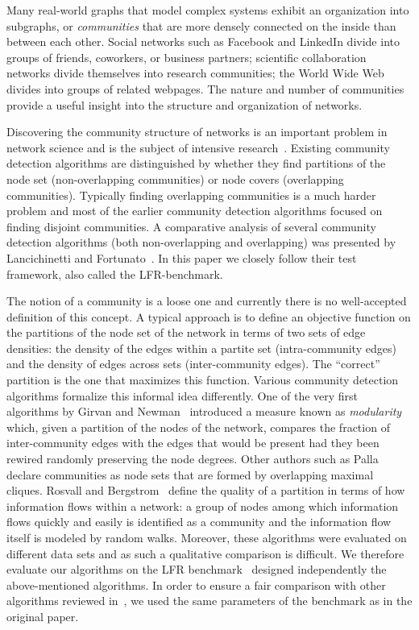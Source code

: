 Many real-world graphs that model complex systems exhibit an organization 
into subgraphs, or \textit{communities} that are more densely connected on the inside than between each other. 
Social networks such as Facebook and LinkedIn divide into groups of friends, 
coworkers, or business partners; scientific collaboration networks divide 
themselves into research communities; the World Wide Web divides into groups 
of related webpages. The nature and number of communities provide 
a useful insight into the structure and organization of networks. 

Discovering the community structure of networks is an 
important problem in network science and is the subject 
of intensive research~\cite{GN02,GN04,CNM04,RCC04,DM04,PDFV05,NL07,BGLL08,RB08,RN09}. 
Existing community detection algorithms are 
distinguished by whether they find partitions of the node set 
(non-overlapping communities) or node covers (overlapping communities). 
Typically finding overlapping communities is a much harder problem and most of the 
earlier community detection algorithms focused on finding disjoint 
communities. A comparative analysis of several community detection algorithms 
(both non-overlapping and overlapping) was presented by Lancichinetti and Fortunato~\cite{LF09}. 
In this paper we closely follow their test framework, also called the LFR-benchmark.

The notion of a community is a loose one and currently there is no 
well-accepted definition of this concept. A typical approach is to define an 
objective function on the partitions of the node set of the network 
in terms of two sets of edge densities: the density of the 
edges within a partite set (intra-community edges) and the density of edges across 
sets (inter-community edges). The ``correct'' partition is the one that maximizes this 
function. Various community detection algorithms formalize this
informal idea differently. One of the very first algorithms by
Girvan and Newman~\cite{GN02} introduced a measure known as \textit{modularity}
which, given a partition of the nodes of the network, compares the fraction of 
inter-community edges with the edges that would be present had they been 
rewired randomly preserving the node degrees. Other authors such as Palla 
\etal~\cite{PDFV05} declare communities as node sets that are formed 
by overlapping maximal cliques. Rosvall and Bergstrom~\cite{RB08} 
define the quality of a partition in terms of how information flows within a network: 
a group of nodes among which information flows quickly and easily is identified 
as a community and the information flow itself is modeled by random walks.
Moreover, these algorithms were evaluated on different data sets and as such 
a qualitative comparison is difficult. We therefore evaluate our algorithms 
on the LFR benchmark~\cite{LF09} designed independently the above-mentioned algorithms. 
In order to ensure a fair comparison with other algorithms reviewed in~\cite{LF09}, 
we used the same parameters of the benchmark as in the original paper.


